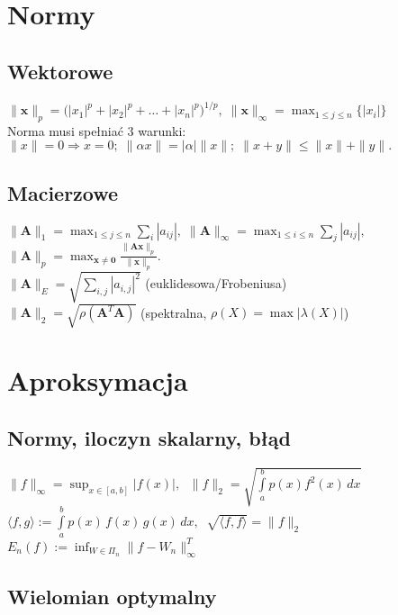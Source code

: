 \documentclass[a4paper,twocolumn]{article}
\begin{document}
\section{Normy}
\subsection{Wektorowe}
${\displaystyle \|\mathbf {x} \|_{p}={\bigl (}|x_{1}|^{p}+|x_{2}|^{p}+\ldots +|x_{n}|^{p}{\bigr )}^{1/p},\;\|\mathbf {x} \|_{\infty }=\max_{1 \leq j \leq n} {\bigl \{}|x_{i}| {\bigr \}}}$ \\
Norma musi spełniać 3 warunki:\\
${\displaystyle \|x\|=0\Rightarrow x=0;\; \|\alpha x\|=|\alpha |\|x\|;\;  \|x+y\|\leqslant \|x\|+\|y\|.}$
\subsection{Macierzowe}
${\displaystyle \|\mathbf {A} \|_{1}=\max _{1 \leq j \leq n}\sum _{i}|a_{ij}|,\; \|\mathbf {A} \|_{\infty }=\max _{1\leq i\leq n}\sum _{j}|a_{ij}|,\;}$\\
${\displaystyle \|\mathbf {A} \|_{p}=\max _{\mathbf {x} \neq \mathbf {0} }{\tfrac {\|\mathbf {Ax} \|_{p}}{\|\mathbf {x} \|_{p}}}.}$\\
${\displaystyle \|\mathbf {A} \|_{E}=\sqrt{\sum_{i,j}|a_{i,j}|^2}}$ (euklidesowa/Frobeniusa)\\
${\displaystyle \|\mathbf {A} \|_{2}=\sqrt{\rho(\mathbf{A}^T\mathbf{A})}}$ (spektralna, $\rho(X) = \max |\lambda(X)|$)


\section{Aproksymacja}

\subsection{Normy, iloczyn skalarny, błąd}
$\|f\|_\infty = \sup_{x \in [a,b]}|f(x)|,\;$
$\|f\|_2 = \sqrt{\int\limits_a^b p(x)f^2(x)\,dx}$\\
$\langle f, g \rangle := \int\limits_a^b p(x)\,f(x)\,g(x)\,dx,\;\; \sqrt{\langle f, f \rangle} = \|f\|_2$\\
$E_n(f) := \inf_{W \in \Pi_n} \|f-W_n\|_\infty^T$

\subsection{Wielomian optymalny}
\end{document}
